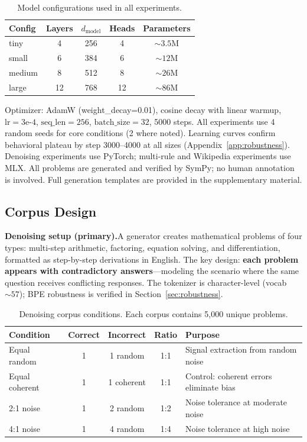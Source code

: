 \documentclass{article}
\begin{document}
\begin{table}[h]
\centering
\small
\begin{tabular}{lcccc}
\toprule
Config & Layers & $d_{\text{model}}$ & Heads & Parameters \\
\midrule
tiny   & 4  & 256 & 4  & ${\sim}3.5$M \\
small  & 6  & 384 & 6  & ${\sim}12$M \\
medium & 8  & 512 & 8  & ${\sim}26$M \\
large  & 12 & 768 & 12 & ${\sim}86$M \\
\bottomrule
\end{tabular}
\caption{Model configurations used in all experiments.}
\label{tab:models}
\end{table}

Optimizer: AdamW (weight\_decay=0.01), cosine decay with linear warmup, $\text{lr}=3\text{e-}4$, $\text{seq\_len}=256$, $\text{batch\_size}=32$, 5000 steps. All experiments use 4 random seeds for core conditions (2 where noted). Learning curves confirm behavioral plateau by step 3000--4000 at all sizes (Appendix~\ref{app:robustness}). Denoising experiments use PyTorch; multi-rule and Wikipedia experiments use MLX. All problems are generated and verified by SymPy; no human annotation is involved. Full generation templates are provided in the supplementary material.

\subsection{Corpus Design}
\label{sec:corpus}

\textbf{Denoising setup (primary).}\quad A generator creates mathematical problems of four types: multi-step arithmetic, factoring, equation solving, and differentiation, formatted as step-by-step derivations in English. The key design: \textbf{each problem appears with contradictory answers}---modeling the scenario where the same question receives conflicting responses. The tokenizer is character-level (vocab ${\sim}57$); BPE robustness is verified in Section~\ref{sec:robustness}.

\begin{table}[h]
\centering
\small
\begin{tabular}{lcccp{4.5cm}}
\toprule
Condition & Correct & Incorrect & Ratio & Purpose \\
\midrule
Equal random   & 1 & 1 random   & 1:1 & Signal extraction from random noise \\
Equal coherent & 1 & 1 coherent & 1:1 & Control: coherent errors eliminate bias \\
2:1 noise      & 1 & 2 random   & 1:2 & Noise tolerance at moderate noise \\
4:1 noise      & 1 & 4 random   & 1:4 & Noise tolerance at high noise \\
\bottomrule
\end{tabular}
\caption{Denoising corpus conditions. Each corpus contains 5,000 unique problems.}
\label{tab:conditions}
\end{table}
\end{document}
